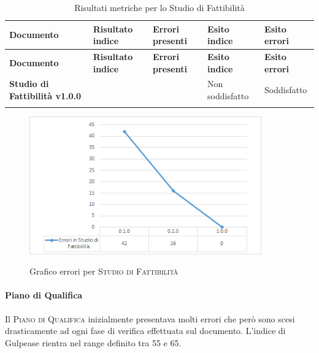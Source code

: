 \documentclass[../piano-di-qualifica.tex]{subfiles}
\begin{document}
\renewcommand{\arraystretch}{2} %
\begin{longtable}[H]{>{\centering\bfseries}m{6cm} >{\centering}m{2cm} >{\centering}m{2.5cm} >{\centering}m{2.5cm} >{\centering\arraybackslash}m{2.5cm}}  
  \rowcolor{lightgray}
  {\textbf{Documento}} & {\textbf{Risultato indice}} & {\textbf{Errori presenti}} & {\textbf{Esito indice}} & {\textbf{Esito errori}}  \\
  \endfirsthead%
  \rowcolor{lightgray}
  {\textbf{Documento}} & {\textbf{Risultato indice}} & {\textbf{Errori presenti}} & {\textbf{Esito indice}} & {\textbf{Esito errori}}  \\
  \endhead%
  \textbf{Studio di Fattibilità v1.0.0} &                  & 0               & Non soddisfatto & Soddisfatto \\
  \caption{Risultati metriche per lo Studio di Fattibilità}
  \label{tab:my-table}
\end{longtable}

    \begin{figure}[H]
        \centering
        \includegraphics[width=10cm]{img/erroriStudio.png}
        \label{fig:scice_documenti}
        \caption{Grafico errori per \textsc{Studio di Fattibilità}}
    \end{figure}

\paragraph{Piano di Qualifica}
\label{sub:piano_di_qualifica}
Il \textsc{Piano di Qualifica} inizialmente presentava molti errori che però sono scesi drasticamente ad ogni fase di verifica effettuata sul documento.
L'indice di Gulpease rientra nel range definito tra 55 e 65.
\end{document}
